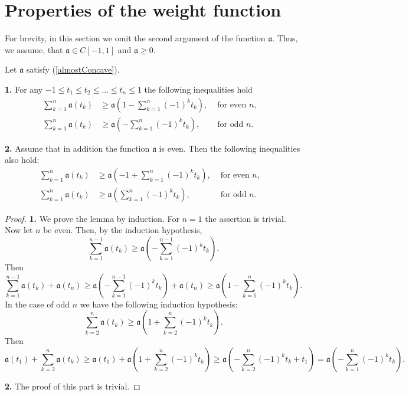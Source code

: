 \section{Properties of the weight function}

For brevity, in this section we omit the second argument of the function $\mathfrak a$.
Thus, we assume, that $\mathfrak a \in C[-1, 1]$ and $\mathfrak a \ge 0$.

\begin{lm}
\label{weightSum}
Let $\mathfrak a$ satisfy (\ref{almostConcave}).

{\bf 1.} For any $-1 \le t_1 \le t_2 \le \ldots \le t_n \le 1$
the following inequalities hold
\begin{align*}
\sum_{k = 1}^n \mathfrak a(t_k) & \ge \mathfrak a( 1 - \sum_{k = 1}^n (-1)^k t_k), & \text{ for even $n$}, & \\
\sum_{k = 1}^n \mathfrak a(t_k) & \ge \mathfrak a(- \sum_{k = 1}^n (-1)^k t_k), & \text{ for odd $n$}. &
\end{align*}

{\bf 2.}
Assume that in addition the function $\mathfrak a$ is even.
Then the following inequalities also hold:
\begin{align*}
\sum_{k = 1}^n \mathfrak a(t_k) & \ge \mathfrak a(-1 + \sum_{k = 1}^n (-1)^k t_k), & \text{ for even $n$}, & \\
\sum_{k = 1}^n \mathfrak a(t_k) & \ge \mathfrak a(\sum_{k = 1}^n (-1)^k t_k), & \text{ for odd $n$}. &
\end{align*}
\end{lm}

\begin{proof}
{\bf 1.}
We prove the lemma by induction.
For $n = 1$ the assertion is trivial.
Now let $n$ be even. Then, by the induction hypothesis,
$$\sum_{k=1}^{n - 1} \mathfrak a(t_k) \ge \mathfrak a( -\sum_{k = 1}^{n - 1} (-1)^k t_k ).$$
Then
$$\sum_{k = 1}^{n - 1} \mathfrak a( t_k ) + \mathfrak a( t_n ) \ge \mathfrak a( -\sum_{k = 1}^{n - 1} (-1)^k t_k ) + \mathfrak a( t_n ) \ge
\mathfrak a( 1 - \sum_{k = 1}^{n} (-1)^k t_k ).$$
In the case of odd $n$ we have the following induction hypothesis:
$$\sum_{k=2}^n \mathfrak a(t_k) \ge \mathfrak a( 1 + \sum_{k = 2}^n (-1)^k t_k ).$$
Then
$$\mathfrak a( t_1 ) + \sum_{k = 2}^n \mathfrak a( t_k ) \ge \mathfrak a( t_1 ) + \mathfrak a( 1 + \sum_{k = 2}^{n} (-1)^k t_k ) \ge
\mathfrak a( -\sum_{k = 2}^{n} (-1)^k t_k + t_1 ) = \mathfrak a( -\sum_{k = 1}^{n} (-1)^k t_k ).$$

{\bf 2.} The proof of this part is trivial. 
\end{proof}

